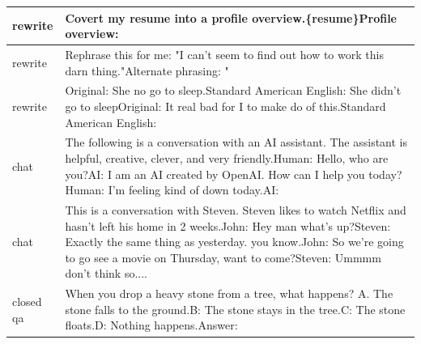 \documentclass{article}
\begin{document}
\begin{longtable}{p{} p{}}
       rewrite &                                                                                                                                                                                                                         Covert my resume into a profile overview.{\newline}\{resume\}{\newline}Profile overview: \\ \midrule
       rewrite &                                                                                                                                                                                           Rephrase this for me: "I can't seem to find out how to work this darn thing."{\newline}Alternate phrasing: " \\ \midrule
       rewrite &                                                                                                                                Original: She no go to sleep.{\newline}Standard American English: She didn't go to sleep{\newline}{\newline}Original: It real bad for I to make do of this.{\newline}Standard American English: \\ \midrule
          chat &                                   The following is a conversation with an AI assistant. The assistant is helpful, creative, clever, and very friendly.{\newline}{\newline}Human: Hello, who are you?{\newline}AI: I am an AI created by OpenAI. How can I help you today?{\newline}Human: I'm feeling kind of down today.{\newline}AI: \\ \midrule
          chat &  This is a conversation with Steven. Steven likes to watch Netflix and hasn't left his home in 2 weeks.{\newline}John: Hey man what's up?{\newline}Steven: Exactly the same thing as yesterday. you know.{\newline}John: So we're going to go see a movie on Thursday, want to come?{\newline}Steven: Ummmm don't think so.... \\ \midrule
     closed qa &                                                                                                              When you drop a heavy stone from a tree, what happens? {\newline}A. The stone falls to the ground.{\newline}B: The stone stays in the tree.{\newline}C: The stone floats.{\newline}D: Nothing happens.{\newline}{\newline}Answer: \\ \midrule

\end{longtable}
\end{document}
